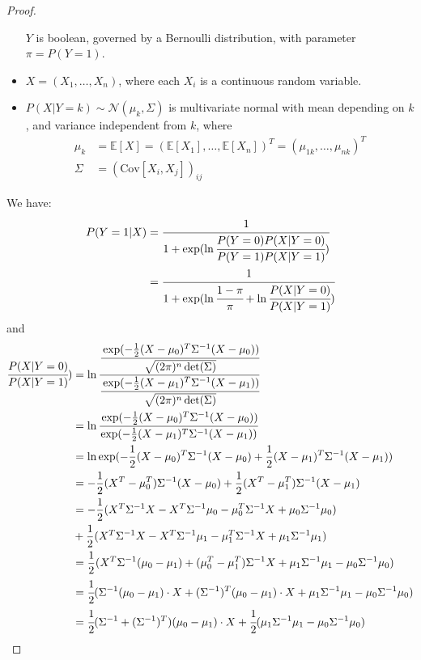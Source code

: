 \documentclass[12pt]{article}
\newcommand{\E}{\mathbb{E}}
\newcommand\inv[1]{#1^{-1}}
\begin{document}
\begin{proof}
\begin{itemize}
    $Y$ is boolean, governed by a Bernoulli distribution, with parameter $\pi = P(Y = 1)$.
  \item
    $X = (X_1, \dots, X_n)$, where each $X_i$ is a continuous random variable.
  \item
    $P(X | Y=k) \sim \mathcal{N}(\mu_{k}, \Sigma)$ is multivariate normal with mean depending on $k$, and variance independent from $k$, where
    \begin{align*}
      \mu_k
      &= \E[X] = (\E[X_1], \dots, \E[X_n])^T = (\mu_{1k}, \dots, \mu_{nk})^T \\
      \Sigma
      &= (\text{Cov}[X_i, X_j])_{ij}
    \end{align*}
  \end{itemize}
  We have:
  \begin{align*}
    P(Y=1|X)
    &= \cfrac{1}{1+\exp(\ln\cfrac{P(Y=0)P(X|Y=0)}{P(Y=1)P(X|Y=1)})} \\
    &= \cfrac{1}{1+\exp(\ln\cfrac{1-\pi}{\pi} + \ln\cfrac{P(X|Y=0)}{P(X|Y=1)})} 
  \end{align*}
  and
  \begin{align*}
    \cfrac{P(X|Y=0)}{P(X|Y=1)})
    &= \ln\cfrac{\cfrac{\exp(-\frac{1}{2}(X-\mu_0)^T\Sigma^{-1}(X-\mu_0))}{\sqrt{(2\pi)^n\det(\Sigma)}}}{\cfrac{\exp(-\frac{1}{2}(X-\mu_1)^T\Sigma^{-1}(X-\mu_1))}{\sqrt{(2\pi)^n\det(\Sigma)}}} \\
    &= \ln\cfrac{\exp(-\frac{1}{2}(X-\mu_0)^T\Sigma^{-1}(X-\mu_0))}{\exp(-\frac{1}{2}(X-\mu_1)^T\Sigma^{-1}(X-\mu_1))} \\
    &= \ln\exp(-\frac{1}{2}(X-\mu_0)^T\Sigma^{-1}(X-\mu_0) + \frac{1}{2}(X-\mu_1)^T\Sigma^{-1}(X-\mu_1)) \\
    &= -\frac{1}{2}(X^T-\mu_0^T)\Sigma^{-1}(X-\mu_0) + \frac{1}{2}(X^T-\mu_1^T)\Sigma^{-1}(X-\mu_1)\\
    &= -\frac{1}{2}(X^T\Sigma^{-1}X -X^T\inv{\Sigma}\mu_{0} - \mu_{0}^T\inv{\Sigma}X + \mu_{0}\inv{\Sigma}\mu_{0}) \\
    &+ \frac{1}{2}(X^T\Sigma^{-1}X -X^T\inv{\Sigma}\mu_{1} - \mu_{1}^T\inv{\Sigma}X + \mu_{1}\inv{\Sigma}\mu_{1}) \\
    &= \frac{1}{2}(X^T\inv{\Sigma}(\mu_{0} -\mu_{1}) + (\mu_{0}^T - \mu_{1}^T)\inv{\Sigma}X + \mu_{1}\inv{\Sigma}\mu_{1} - \mu_{0}\inv{\Sigma}\mu_{0}) \\
    &= \cfrac{1}{2}( \Sigma^{-1}(\mu_0 - \mu_1) \cdot X + (\Sigma^{-1})^T(\mu_0 - \mu_1) \cdot X + \mu_{1}\inv{\Sigma}\mu_{1} - \mu_{0}\inv{\Sigma}\mu_{0})\\
    &= \cfrac{1}{2}(\Sigma^{-1} + (\Sigma^{-1})^T)(\mu_0 - \mu_1)\cdot X +\cfrac{1}{2}(\mu_{1}\inv{\Sigma}\mu_{1} - \mu_{0}\inv{\Sigma}\mu_{0}) \\

\end{align*}
\end{proof}
\end{document}
